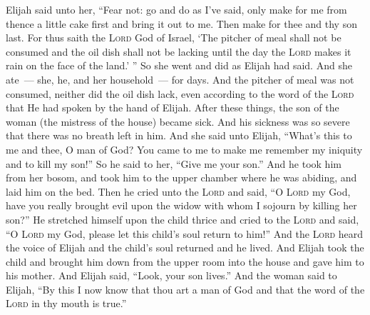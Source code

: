 \begin{inparaenum}
     Elijah said unto her, ``Fear not: go and do as I've said, only make for me from thence a little cake first and bring it out to me. Then make for thee and thy son last.%
     For thus saith the \textsc{Lord} God of Israel, `The pitcher of meal shall not be consumed and the oil dish shall not be lacking until the day the \textsc{Lord} makes it rain on the face of the land.' ''%
     So she went and did as Elijah had said. And she ate~--- she, he, and her household~--- for days.%
     And the pitcher of meal was not consumed, neither did the oil dish lack, even according to the word of the \textsc{Lord} that He had spoken by the hand of Elijah.%
     After these things, the son of the woman (the mistress of the house) became sick. And his sickness was so severe that there was no breath left in him.%
     And she said unto Elijah, ``What's this to me and thee, O man of God? You came to me to make me remember my iniquity and to kill my son!''%
     So he said to her, ``Give me your son.'' And he took him from her bosom, and took him to the upper chamber where he was abiding, and laid him on the bed.%
     Then he cried unto the \textsc{Lord} and said, ``O \textsc{Lord} my God, have you really brought evil upon the widow with whom I sojourn by killing her son?''%
     He stretched himself upon the child thrice and cried to the \textsc{Lord} and said, ``O \textsc{Lord} my God, please let this child's soul return to him!''%
     And the \textsc{Lord} heard the voice of Elijah and the child's soul returned and he lived.%
     And Elijah took the child and brought him down from the upper room into the house and gave him to his mother. And Elijah said, ``Look, your son lives.''%
     And the woman said to Elijah, ``By this I now know that thou art a man of God and that the word of the \textsc{Lord} in thy mouth is true.''%
\end{inparaenum}
